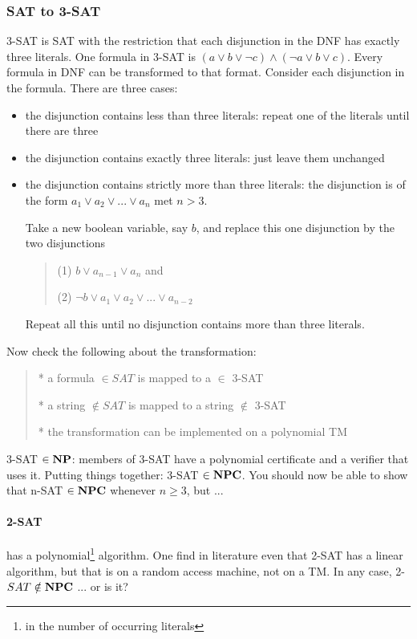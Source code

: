 \subsubsection{SAT to 3-SAT}

3-SAT is SAT with the restriction that each disjunction in the DNF has
exactly three literals. One formula in 3-SAT is
%
$(a \vee b \vee \neg c) \wedge (\neg a \vee b \vee c)$. Every formula
in DNF can be transformed to that format. Consider each disjunction in
the formula. There are three cases:
\begin{itemize}
\item 
the disjunction contains less than three literals: repeat one of the
literals until there are three
\item 
the disjunction contains exactly three literals: just leave them
unchanged
\item 
the disjunction contains strictly more than three literals: the
disjunction is of the form
%
$a_1 \vee a_2 \vee  ... \vee a_n$ met $n > 3$.

Take a new boolean variable, say $b$, and replace this one disjunction
by the two disjunctions
\begin{verse}
(1) $b \vee a_{n-1} \vee a_n$ and

(2) $\neg b \vee a_1 \vee a_2 \vee  ... \vee a_{n-2}$
\end{verse}

Repeat all this until no disjunction contains more than three literals.
\end{itemize}

Now check the following about the transformation:
\begin{verse}
* a formula $\in SAT$ is mapped to a $ \in$ 3-SAT

* a string $\notin SAT$ is mapped to a string $ \notin$ 3-SAT

* the transformation can be implemented on a polynomial TM
\end{verse}



3-SAT $\in {\bf NP}$: members of 3-SAT have a polynomial certificate and a
verifier that uses it. Putting things together: 3-SAT $\in {\bf NPC}$. You
should now be able to show that n-SAT $\in {\bf NPC}$ whenever $n \geq 3$,
but ...

\paragraph{2-SAT} has a polynomial\footnote{in the number of occurring
literals} algorithm. One find in literature even that 2-SAT has a
linear algorithm, but that is on a random access machine, not on a
TM. In any case, 2-$SAT \notin {\bf NPC}$ ... or is it?


